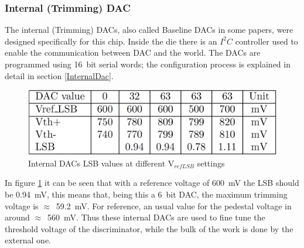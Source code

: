 \subsubsection{Internal (Trimming) DAC}
The internal (Trimming) DACs, also called Baseline DACs in some papers, were designed specifically for this chip. Inside the die there is an $I^2C$ controller used to enable the communication between DAC and the world.
The DACs are programmed using 16~bit serial words; the configuration process is explained in detail in section \ref{InternalDac}.
\begin{figure}[H]
	\centering
	\includegraphics[width=0.5\linewidth]{IMG/ch2/INTDACTABLE}
	\caption{Internal DACs LSB values at different V$_{refLSB}$ settings}
	\label{fig:intdactable}
\end{figure}
\noindent In figure \ref{fig:intdactable} it can be seen that with a reference voltage of 600~mV the LSB should be 0.94~mV, this means that, being this a 6~bit DAC, the maximum trimming voltage is $\approx$~59.2~mV. For reference, an usual value for the pedestal voltage in around $\approx$~560~mV. Thus these internal DACs are used to fine tune the threshold voltage of the discriminator, while the bulk of the work is done by the external one.   

